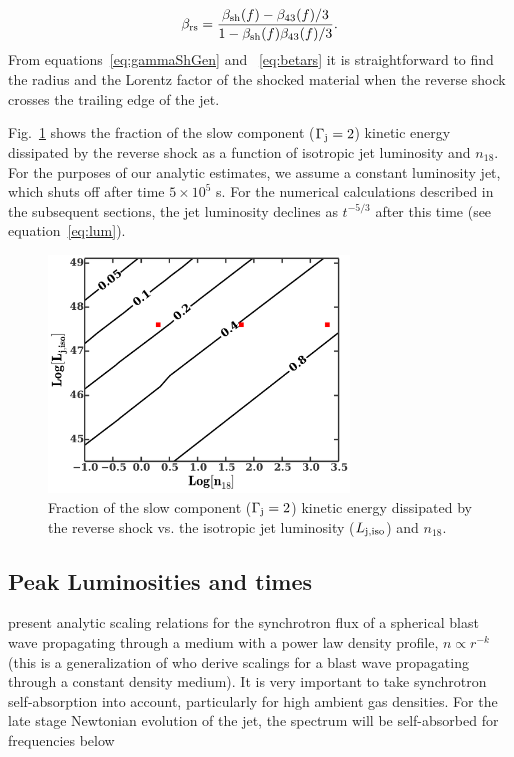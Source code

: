 \documentclass[usenatbib,fleqn]{mnras}
\begin{document}
\begin{equation}
\beta_{\rm rs}=\frac{\beta_{\rm sh}(f)-\beta_{43}(f)/3}{1-\beta_{\rm
    sh}(f) \beta_{43}(f)/3}.
\label{eq:betars}
\end{equation} 
%
From equations~\eqref{eq:gammaShGen} and ~\eqref{eq:betars} it is
straightforward to find the radius and the Lorentz factor of the
shocked material when the reverse shock crosses the trailing edge of
the jet.

Fig.~\ref{fig:diss} shows the fraction of the slow component
($\Gamma_{\rm j}=2$) kinetic energy dissipated by the reverse shock as a
function of isotropic jet luminosity and $n_{18}$. For the purposes of
our analytic estimates, we assume a constant luminosity jet, which
shuts off after time $5 \times 10^{5}$ s. For the numerical
calculations described in the subsequent sections, the jet luminosity
declines as $t^{-5/3}$ after this time (see equation~\ref{eq:lum}).

\begin{figure}
\includegraphics[width=8cm]{diss.pdf}
\caption{\label{fig:diss} Fraction of the slow component
  ($\Gamma_{\rm j}=2$) kinetic energy dissipated by the reverse shock
  vs. the isotropic jet luminosity ($L_{\rm j,iso}$) and $n_{18}$.}
\end{figure}

\subsection{Peak Luminosities and times}

\citet{Leventis+2012} present analytic scaling relations for the
synchrotron flux of a spherical blast wave propagating through a
medium with a power law density profile, $n\propto r^{-k}$ (this is a
generalization of \citealt{Nakar&Piran2011} who derive scalings for a
blast wave propagating through a constant density medium). It is very
important to take synchrotron self-absorption into account,
particularly for high ambient gas densities. For the late stage
Newtonian evolution of the jet, the spectrum will be self-absorbed
for frequencies below 
\end{document}
